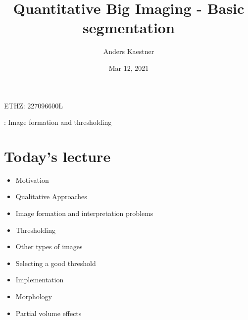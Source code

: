 \documentclass[letterpaper,10pt,english]{sphinxmanual}
\title{Quantitative Big Imaging - Basic segmentation}
\date{Mar 12, 2021}
\author{Anders Kaestner}
\begin{document}
\pagestyle{empty}
\sphinxmaketitle
\pagestyle{plain}
\sphinxtableofcontents
\pagestyle{normal}
\label{\detokenize{04-BasicSegmentation::doc}}




\sphinxAtStartPar
{} ETHZ: 227\sphinxhyphen{}0966\sphinxhyphen{}00L

\sphinxAtStartPar
{}: Image formation and thresholding






\chapter{Today’s lecture}
\label{\detokenize{04-BasicSegmentation:today-s-lecture}}\begin{itemize}
\item {} 
\sphinxAtStartPar
Motivation

\item {} 
\sphinxAtStartPar
Qualitative Approaches

\item {} 
\sphinxAtStartPar
Image formation and interpretation problems

\item {} 
\sphinxAtStartPar
Thresholding

\item {} 
\sphinxAtStartPar
Other types of images

\item {} 
\sphinxAtStartPar
Selecting a good threshold

\item {} 
\sphinxAtStartPar
Implementation

\item {} 
\sphinxAtStartPar
Morphology

\item {} 
\sphinxAtStartPar
Partial volume effects

\end{itemize}
\end{document}
